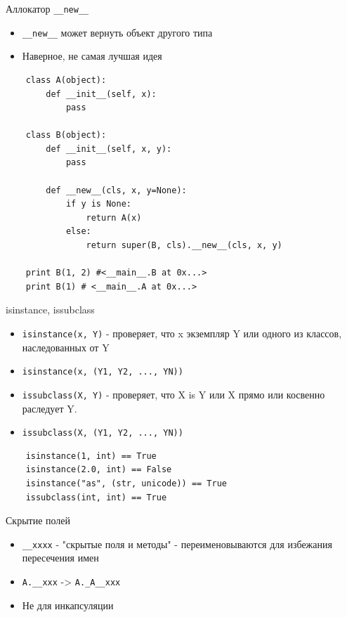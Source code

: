 \documentclass{article}
\begin{document}
\begin{center} Аллокатор \lstinline!__new__! \end{center}
\begin{itemize}
    \item \lstinline!__new__! может вернуть объект другого типа
    \item Наверное, не самая лучшая идея
\end{itemize}
\vspace{15pt}
\begin{lstlisting}
    class A(object):
        def __init__(self, x):
            pass

    class B(object):
        def __init__(self, x, y):
            pass

        def __new__(cls, x, y=None):
            if y is None:
                return A(x)
            else:
                return super(B, cls).__new__(cls, x, y)

    print B(1, 2) #<__main__.B at 0x...>
    print B(1) # <__main__.A at 0x...>    
\end{lstlisting}
\newpage

\begin{center}isinstance, issubclass\end{center}
\begin{itemize}
    \item \lstinline!isinstance(x, Y)! - проверяет, что x экземпляр Y или
              одного из классов, наследованных от Y
    \item \lstinline!isinstance(x, (Y1, Y2, ..., YN))!
    \item \lstinline!issubclass(X, Y)! - проверяет, что X is Y или X
            прямо или косвенно раследует Y.
    \item \lstinline!issubclass(X, (Y1, Y2, ..., YN))!
\end{itemize}

\begin{lstlisting}
    isinstance(1, int) == True
    isinstance(2.0, int) == False
    isinstance("as", (str, unicode)) == True
    issubclass(int, int) == True
\end{lstlisting}
\newpage

\begin{center} Скрытие полей \end{center}
\begin{itemize}
    \item \lstinline!__xxxx! - "скрытые поля и методы" 
        - переименовываются для избежания пересечения имен
    \item \lstinline!A.__xxx! -> \lstinline!A._A__xxx!
    \item Не для инкапсуляции
\end{itemize}
\newpage
\end{document}
